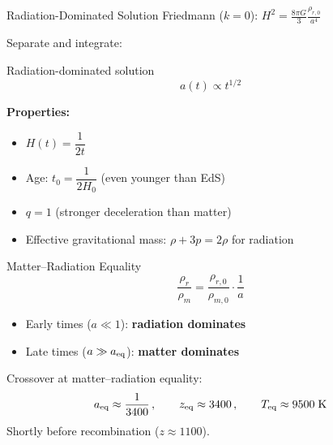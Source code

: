 \documentclass[aspectratio=169,11pt]{beamer}
\newcommand{\Hnot}{H_0}
\begin{document}
\begin{frame}{Radiation-Dominated Solution}
Friedmann ($k=0$): $H^2 = \frac{8\pi G}{3}\frac{\rho_{r,0}}{a^4}$

Separate and integrate:
\begin{exampleblock}{Radiation-dominated solution}
\begin{equation*}
    a(t) \propto t^{1/2}
\end{equation*}
\end{exampleblock}
\textbf{Properties:}
\begin{itemize}
    \item $H(t) = \dfrac{1}{2t}$
    \item Age: $t_0 = \dfrac{1}{2\Hnot}$ (even younger than EdS)
    \item $q=1$ (stronger deceleration than matter)
    \item Effective gravitational mass: $\rho+3p=2\rho$ for radiation
\end{itemize}
\end{frame}

\begin{frame}{Matter--Radiation Equality}
\begin{equation*}
    \frac{\rho_r}{\rho_m}
    = \frac{\rho_{r,0}}{\rho_{m,0}}\cdot\frac{1}{a}
\end{equation*}
\begin{itemize}
    \item Early times ($a\ll 1$): \textbf{radiation dominates}
    \item Late times ($a\gg a_{\rm eq}$): \textbf{matter dominates}
\end{itemize}
\vspace{0.3cm}
Crossover at matter--radiation equality:
\begin{equation*}
    a_{\rm eq} \approx \frac{1}{3400}\,,\qquad
    z_{\rm eq} \approx 3400\,,\qquad
    T_{\rm eq} \approx 9500\;\text{K}
\end{equation*}
Shortly before recombination ($z\approx 1100$).
\end{frame}
\end{document}

